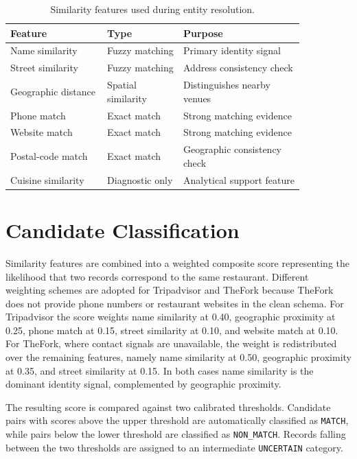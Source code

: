 \begin{table}[t]
\centering
\footnotesize
\begin{tabular}{p{0.28\linewidth}p{0.22\linewidth}p{0.35\linewidth}}
\toprule
\textbf{Feature} & \textbf{Type} & \textbf{Purpose} \\
\midrule
Name similarity & Fuzzy matching & Primary identity signal \\
Street similarity & Fuzzy matching & Address consistency check \\
Geographic distance & Spatial similarity & Distinguishes nearby venues \\
Phone match & Exact match & Strong matching evidence \\
Website match & Exact match & Strong matching evidence \\
Postal-code match & Exact match & Geographic consistency check \\
Cuisine similarity & Diagnostic only & Analytical support feature \\
\bottomrule
\end{tabular}
\caption{Similarity features used during entity resolution.}
\label{tab:er-features}
\end{table}

\section{Candidate Classification}

Similarity features are combined into a weighted composite score representing the likelihood that two records correspond to the same restaurant. Different weighting schemes are adopted for Tripadvisor and TheFork because TheFork does not provide phone numbers or restaurant websites in the clean schema. For Tripadvisor the score weights name similarity at 0.40, geographic proximity at 0.25, phone match at 0.15, street similarity at 0.10, and website match at 0.10. For TheFork, where contact signals are unavailable, the weight is redistributed over the remaining features, namely name similarity at 0.50, geographic proximity at 0.35, and street similarity at 0.15. In both cases name similarity is the dominant identity signal, complemented by geographic proximity.

The resulting score is compared against two calibrated thresholds. Candidate pairs with scores above the upper threshold are automatically classified as \texttt{MATCH}, while pairs below the lower threshold are classified as \texttt{NON\_MATCH}. Records falling between the two thresholds are assigned to an intermediate \texttt{UNCERTAIN} category.

